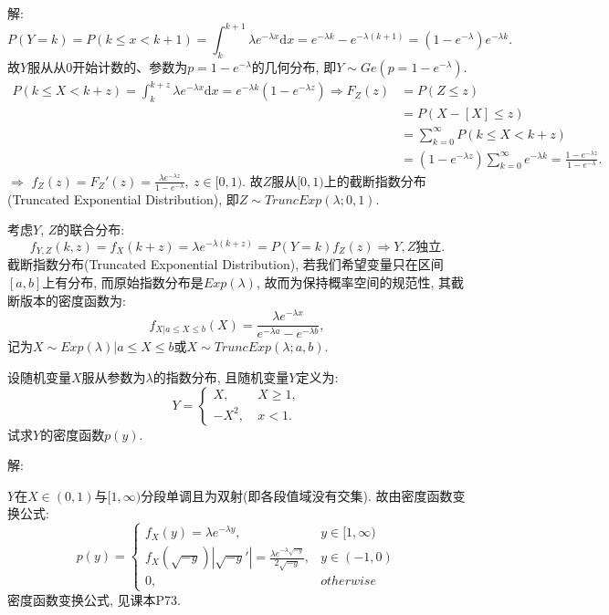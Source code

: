 \documentclass[standard]{ExBook}
\renewenvironment{shaded}{%
  \def\FrameCommand{\fboxsep=\FrameSep \colorbox{shadecolor}}%
  \MakeFramed{\advance\hsize-\width \FrameRestore}%
}{%
  \endMakeFramed
}
\begin{document}
\begin{qitems}
解: 
$$P(Y=k)=P(k\leq x< k+1)=\displaystyle\int_{k}^{k+1}\lambda e^{-\lambda x}\mathrm{d}x=e^{-\lambda k}-e^{-\lambda (k+1)}=(1-e^{-\lambda})e^{-\lambda k}.$$
故$Y$服从从0开始计数的、参数为$p=1-e^{-\lambda}$的几何分布, 即$Y\sim Ge(p=1-e^{-\lambda})$.
$$
\begin{aligned}
P(k\leq X<k+z)
=\displaystyle\int_{k}^{k+z}\lambda e^{-\lambda x}\mathrm{d}x
=e^{-\lambda k}(1-e^{-\lambda z})
\Longrightarrow
F_{Z}(z)
&=P(Z\leq z)\\
&=P(X-[X]\leq z)\\
&=\sum\limits_{k=0}^{\infty}P(k\leq X<k+z)\\
&=(1-e^{-\lambda z})\sum\limits_{k=0}^{\infty}e^{-\lambda k}=\displaystyle\frac{1-e^{-\lambda z}}{1-e^{-\lambda}}.
\end{aligned}
$$
$\Longrightarrow$ $f_{Z}(z)=F_{Z}'(z)=\displaystyle\frac{\lambda e^{-\lambda z}}{1-e^{-\lambda}},\ z\in[0,1)$. 故$Z$服从$[0,1)$上的截断指数分布(Truncated Exponential Distribution), 即$Z\sim TruncExp(\lambda;0,1)$.

考虑$Y$, $Z$的联合分布:
$$f_{Y,Z}(k,z)=f_{X}(k+z)=\lambda e^{-\lambda(k+z)}=P(Y=k)f_{Z}(z) \Longrightarrow Y, Z\text{独立}.$$
\textcolor{themeColor}{\selectfont {} 截断指数分布(Truncated Exponential Distribution), 若我们希望变量只在区间$[a,b]$上有分布, 而原始指数分布是$Exp(\lambda)$, 故而为保持概率空间的规范性, 其截断版本的密度函数为:
$$f_{X|a\leq X\leq b}(X)=\displaystyle\frac{\lambda e^{-\lambda x}}{e^{-\lambda a}-e^{-\lambda b}},$$
记为$X\sim Exp(\lambda)|a\leq X\leq b$或$X\sim TruncExp(\lambda;a,b)$.}

\vspace{2.5cm-5em}

    \begin{bbox}
    \begin{shaded}
        \qitem
设随机变量$X$服从参数为$\lambda$的指数分布, 且随机变量$Y$定义为:
$$
    Y=
    \left\{
    \begin{array}{ll}
        X,\ &X \geq 1,\\
        -X^2,\ &x < 1.
    \end{array}
    \right.
$$
试求$Y$的密度函数$p(y)$.
    \end{shaded}
    \end{bbox}

\vspace{\dimexpr2.5cm-5em\relax}

解: 

$Y$在$X\in(0,1)$与$[1,\infty)$分段单调且为双射(即各段值域没有交集). 故由密度函数变换公式:
$$
    p(y)=
    \left\{
    \begin{array}{ll}
        f_{X}(y)=\lambda e^{-\lambda y}, &y\in[1,\infty)\\
        f_{X}(\sqrt{-y})|\sqrt{-y}'|=\displaystyle\frac{\lambda e^{-\lambda\sqrt{-y}}}{2\sqrt{-y}}, &y\in(-1,0)\\
        0, &otherwise
    \end{array}
    \right.
$$
\textcolor{themeColor}{\selectfont {} 密度函数变换公式, 见课本P73.}


\end{qitems}
\end{document}
